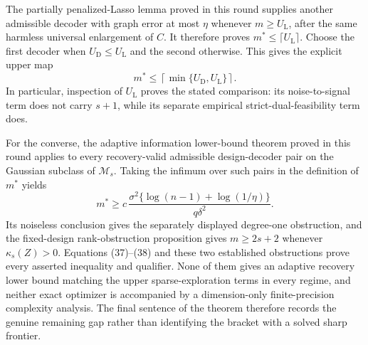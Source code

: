 The partially penalized-Lasso lemma proved in this round supplies another admissible decoder with graph error at most \(\eta\) whenever \(m\ge U_{\mathrm L}\), after the same harmless universal enlargement of \(C\).  It therefore proves \(m^*\le\lceil U_{\mathrm L}\rceil\).  Choose the first decoder when \(U_{\mathrm D}\le U_{\mathrm L}\) and the second otherwise.  This gives the explicit upper map
\[
 m^*\le\left\lceil\min\{U_{\mathrm D},U_{\mathrm L}\}\right\rceil. \tag{37}
\]
In particular, inspection of \(U_{\mathrm L}\) proves the stated comparison: its noise-to-signal term does not carry \(s+1\), while its separate empirical strict-dual-feasibility term does.

For the converse, the adaptive information lower-bound theorem proved in this round applies to every recovery-valid admissible design-decoder pair on the Gaussian subclass of \(\mathcal M_s\).  Taking the infimum over such pairs in the definition of \(m^*\) yields
\[
 m^*\ge c\,\frac{\sigma^2\{\log(n-1)+\log(1/\eta)\}}{q\delta^2}. \tag{38}
\]
Its noiseless conclusion gives the separately displayed degree-one obstruction, and the fixed-design rank-obstruction proposition gives \(m\ge2s+2\) whenever \(\kappa_s(Z)>0\).  Equations (37)--(38) and these two established obstructions prove every asserted inequality and qualifier.  None of them gives an adaptive recovery lower bound matching the upper sparse-exploration terms in every regime, and neither exact optimizer is accompanied by a dimension-only finite-precision complexity analysis.  The final sentence of the theorem therefore records the genuine remaining gap rather than identifying the bracket with a solved sharp frontier.